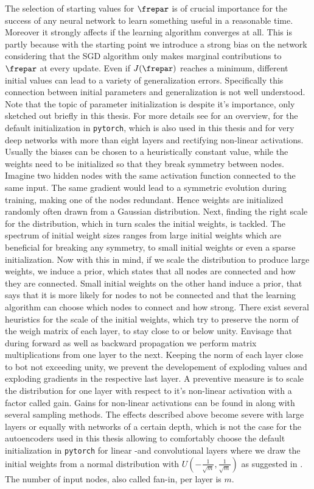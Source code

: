 The selection of starting values for \(\frepar\) is of crucial importance for the success of any neural network to learn something useful in a reasonable time. Moreover it strongly affects if the learning algorithm converges at all. This is partly because with the starting point we introduce a strong bias on the network considering that the SGD algorithm only makes marginal contributions to \(\frepar\) at every update. Even if \(J(\frepar)\) reaches a minimum, different initial values can lead to a variety of generalization errors. Specifically this connection between initial parameters and generalization is not well understood. Note that the topic of parameter initialization is despite it's importance, only sketched out briefly in this thesis. For more details see \cite{Goodfellow} for an overview, \cite{LeCun98} for the default initialization in \texttt{pytorch}, which is also used in this thesis and \cite{he2015} for very deep networks with more than eight layers and rectifying non-linear activations.\\
Usually the biases can be chosen to a heuristically constant value, while the weights need to be initialized so that they break symmetry between nodes. Imagine two hidden nodes with the same activation function connected to the same input. The same gradient would lead to a symmetric evolution during training, making one of the nodes redundant. Hence weights are initialized randomly often drawn from a Gaussian distribution. Next, finding the right scale for the distribution, which in turn scales the initial weights, is tackled. The spectrum of initial weight sizes ranges from large initial weights which are beneficial for breaking any symmetry, to small initial weights or even a sparse initialization. Now with this in mind, if we scale the distribution to produce large weights, we induce a prior, which states that all nodes are connected and how they are connected. Small initial weights on the other hand induce a prior, that says that it is more likely for nodes to not be connected and that the learning algorithm can choose which nodes to connect and how strong. There exist several heuristics for the scale of the initial weights, which try to preserve the norm of the weigh matrix of each layer, to stay close to or below unity. Envisage that during forward as well as backward propagation we perform matrix multiplications from one layer to the next. Keeping the norm of each layer close to bot not exceeding unity, we prevent the developement of exploding values and exploding gradients in the respective last layer. A preventive measure is to scale the distribution for one layer with respect to it's non-linear activation with a factor called gain. Gains for non-linear activations can be found in \cite{torch_ini} along with several sampling methods. The effects described above become severe with large layers or equally with networks of a certain depth, which is not the case for the autoencoders used in this thesis allowing to comfortably choose the default initialization in \texttt{pytorch} for linear -and convolutional layers where we draw the initial weights from a normal distribution with \(U(-\frac{1}{\sqrt{m}},\frac{1}{\sqrt{m}})\) as suggested in \cite{LeCun98}. The number of input nodes, also called fan-in, per layer is \(m\).  

